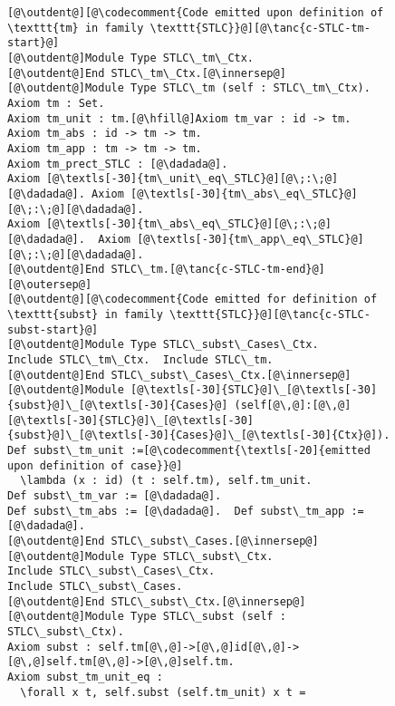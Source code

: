 \begin{figure}
\vspace{-5pt}
\begin{minipage}{\textwidth}
\begin{multicols}{2}



\newcommand{\innersep}{\vspace{6pt}}
\newcommand{\outersep}{\vspace{5pt}}
\newcommand{\outdent}{\!\!\!}

\begin{lstlisting}
[@\outdent@][@\codecomment{Code emitted upon definition of \texttt{tm} in family \texttt{STLC}}@][@\tanc{c-STLC-tm-start}@]
[@\outdent@]Module Type STLC\_tm\_Ctx.
[@\outdent@]End STLC\_tm\_Ctx.[@\innersep@]
[@\outdent@]Module Type STLC\_tm (self : STLC\_tm\_Ctx).
Axiom tm : Set.
Axiom tm_unit : tm.[@\hfill@]Axiom tm_var : id -> tm.
Axiom tm_abs : id -> tm -> tm.
Axiom tm_app : tm -> tm -> tm.
Axiom tm_prect_STLC : [@\dadada@].
Axiom [@\textls[-30]{tm\_unit\_eq\_STLC}@][@\;:\;@][@\dadada@]. Axiom [@\textls[-30]{tm\_abs\_eq\_STLC}@][@\;:\;@][@\dadada@].
Axiom [@\textls[-30]{tm\_abs\_eq\_STLC}@][@\;:\;@][@\dadada@].  Axiom [@\textls[-30]{tm\_app\_eq\_STLC}@][@\;:\;@][@\dadada@].
[@\outdent@]End STLC\_tm.[@\tanc{c-STLC-tm-end}@][@\outersep@]
[@\outdent@][@\codecomment{Code emitted for definition of \texttt{subst} in family \texttt{STLC}}@][@\tanc{c-STLC-subst-start}@]
[@\outdent@]Module Type STLC\_subst\_Cases\_Ctx.
Include STLC\_tm\_Ctx.  Include STLC\_tm.
[@\outdent@]End STLC\_subst\_Cases\_Ctx.[@\innersep@]
[@\outdent@]Module [@\textls[-30]{STLC}@]\_[@\textls[-30]{subst}@]\_[@\textls[-30]{Cases}@] (self[@\,@]:[@\,@][@\textls[-30]{STLC}@]\_[@\textls[-30]{subst}@]\_[@\textls[-30]{Cases}@]\_[@\textls[-30]{Ctx}@]).
Def subst\_tm_unit :=[@\codecomment{\textls[-20]{emitted upon definition of case}}@]
  \lambda (x : id) (t : self.tm), self.tm_unit.
Def subst\_tm_var := [@\dadada@].
Def subst\_tm_abs := [@\dadada@].  Def subst\_tm_app := [@\dadada@].
[@\outdent@]End STLC\_subst\_Cases.[@\innersep@]
[@\outdent@]Module Type STLC\_subst\_Ctx.
Include STLC\_subst\_Cases\_Ctx.
Include STLC\_subst\_Cases.
[@\outdent@]End STLC\_subst\_Ctx.[@\innersep@]
[@\outdent@]Module Type STLC\_subst (self : STLC\_subst\_Ctx).
Axiom subst : self.tm[@\,@]->[@\,@]id[@\,@]->[@\,@]self.tm[@\,@]->[@\,@]self.tm.
Axiom subst_tm_unit_eq :
  \forall x t, self.subst (self.tm_unit) x t =

\end{lstlisting}
\end{multicols}
\end{minipage}
\end{figure}
